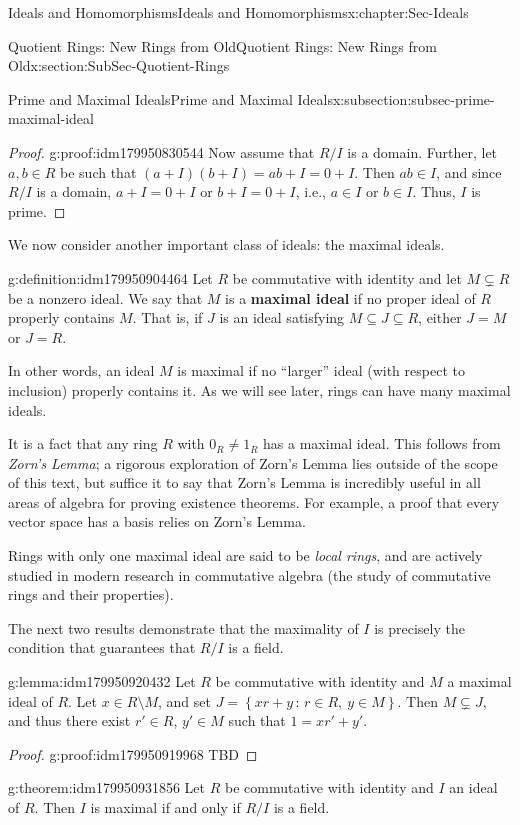 \documentclass[oneside,10pt,]{book}
\newcommand{\terminology}[1]{\textbf{#1}}
\numberwithin{equation}{section}
\newcommand{\setof}[2]{{\left\{#1\,\colon\,#2\right\}}}
\begin{document}
\begin{chapterptx}{Ideals and Homomorphisms}{}{Ideals and Homomorphisms}{}{}{x:chapter:Sec-Ideals}
\begin{sectionptx}{Quotient Rings: New Rings from Old}{}{Quotient Rings: New Rings from Old}{}{}{x:section:SubSec-Quotient-Rings}
\begin{subsectionptx}{Prime and Maximal Ideals}{}{Prime and Maximal Ideals}{}{}{x:subsection:subsec-prime-maximal-ideal}
\begin{proof}{}{g:proof:idm179950830544}
Now assume that \(R/I\) is a domain. Further, let \(a,b\in R\) be such that \((a+I)(b+I) = ab+I = 0+I\). Then \(ab\in I\), and since \(R/I\) is a domain, \(a+I = 0+I\) or \(b+I = 0+I\), i.e., \(a\in I\) or \(b\in I\). Thus, \(I\) is prime.%
\end{proof}
We now consider another important class of ideals: the maximal ideals.%
\begin{definition}{}{g:definition:idm179950904464}%
%
%
Let \(R\) be commutative with identity and let \(M\subsetneq R\) be a nonzero ideal. We say that \(M\) is a \terminology{maximal ideal} if no proper ideal of \(R\) properly contains \(M\). That is, if \(J\) is an ideal satisfying \(M\subseteq J\subseteq R\), either \(J=M\) or \(J=R\).%
\end{definition}
In other words, an ideal \(M\) is maximal if no ``larger'' ideal (with respect to inclusion) properly contains it. As we will see later, rings can have many maximal ideals.%
\par
It is a fact that any ring \(R\) with \(0_R\ne 1_R\) has a maximal ideal. This follows from \emph{Zorn's Lemma}; a rigorous exploration of Zorn's Lemma lies outside of the scope of this text, but suffice it to say that Zorn's Lemma is incredibly useful in all areas of algebra for proving existence theorems. For example, a proof that every vector space has a basis relies on Zorn's Lemma.%
\par
Rings with only one maximal ideal are said to be \emph{local rings}, and are actively studied in modern research in commutative algebra (the study of commutative rings and their properties).%
\par
The next two results demonstrate that the maximality of \(I\) is precisely the condition that guarantees that \(R/I\) is a field.%
\begin{lemma}{}{}{g:lemma:idm179950920432}%
Let \(R\) be commutative with identity and \(M\) a maximal ideal of \(R\). Let \(x\in R\setminus M\), and set \(J = \setof{xr+y}{r\in R, \ y\in M}\). Then \(M\subsetneq J\), and thus there exist \(r'\in R\), \(y'\in M\) such that \(1 = xr'+y'\).%
\end{lemma}
\begin{proof}{}{g:proof:idm179950919968}
TBD\end{proof}
\begin{theorem}{}{}{g:theorem:idm179950931856}%
Let \(R\) be commutative with identity and \(I\) an ideal of \(R\). Then \(I\) is maximal if and only if \(R/I\) is a field.%

\end{theorem}
\end{subsectionptx}
\end{sectionptx}
\end{chapterptx}
\end{document}
